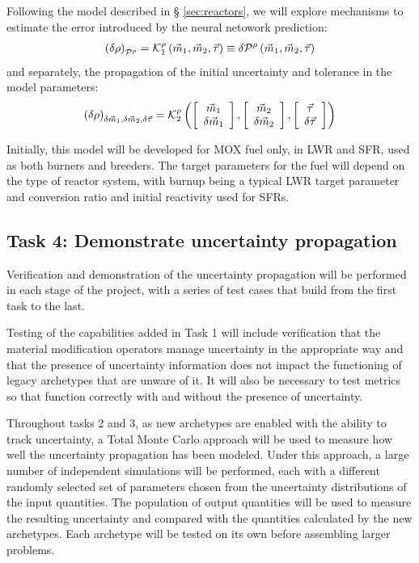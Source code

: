 \documentclass[dvips,12pt]{article}
\newcommand{\unc}[1]
{ \delta #1 }
\newcommand{\uncvector}[1]
{ \left[ \begin{array}{c} #1 \\ \delta #1 \end{array} \right] }
\begin{document}
Following the model described in \S
\ref{sec:reactors}, we will explore mechanisms to
estimate the error introduced by the neural
netowork prediction:
\begin{align}
  \left(\unc{\rho}\right)_{\cal P^\rho} = {\cal K}_1^{\rho}\left( \vec{m}_{1},\vec{m}_{2}, \vec{\tau} \right) \equiv \delta {\cal P}^\rho\left( \vec{m}_{1},\vec{m}_{2}, \vec{\tau} \right)
\end{align}
and separately, the propagation of the initial uncertainty and tolerance in the model parameters:
\begin{align}
  \left(\unc{\rho}\right)_{\unc{\vec{m}_{1}},\unc{\vec{m}_{2}},\unc{\vec{\tau}}} = {\cal K}^{\rho}_2\left( \uncvector{\vec{m}_{1}},\uncvector{\vec{m}_{2}}, \uncvector{\vec{\tau}} \right)
\end{align}

Initially, this model will be developed for MOX
fuel only, in LWR and SFR, used as both burners
and breeders.  The target parameters for the fuel
will depend on the type of reactor system, with
burnup being a typical LWR target parameter and
conversion ratio and initial reactivity used for
SFRs.

\subsection{Task 4: Demonstrate uncertainty propagation}

Verification and demonstration of the uncertainty
propagation will be performed in each stage of the
project, with a series of test cases that build
from the first task to the last.

Testing of the capabilities added in Task 1 will
include verification that the material
modification operators manage uncertainty in the
appropriate way and that the presence of
uncertainty information does not impact the
functioning of legacy archetypes that are unware
of it.  It will also be necessary to test metrics
so that function correctly with and without the
presence of uncertainty.

Throughout tasks 2 and 3, as new archetypes are
enabled with the ability to track uncertainty, a
Total Monte Carlo approach will be used to measure
how well the uncertainty propagation has been
modeled.  Under this approach, a large number of
independent simulations will be performed, each
with a different randomly selected set of
parameters chosen from the uncertainty
distributions of the input quantities.  The
population of output quantities will be used to
measure the resulting uncertainty and compared
with the quantities calculated by the new
archetypes.  Each archetype will be tested on its
own before assembling larger problems.
\end{document}
